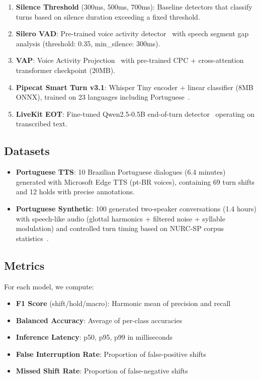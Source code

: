 \documentclass[conference]{IEEEtran}
\begin{document}
\begin{enumerate}
    \item \textbf{Silence Threshold} (300ms, 500ms, 700ms): Baseline detectors
          that classify turns based on silence duration exceeding a fixed threshold.
    \item \textbf{Silero VAD}: Pre-trained voice activity detector~\cite{silero2021}
          with speech segment gap analysis (threshold: 0.35, min\_silence: 300ms).
    \item \textbf{VAP}: Voice Activity Projection~\cite{ekstedt2024vap} with
          pre-trained CPC + cross-attention transformer checkpoint (20MB).
    \item \textbf{Pipecat Smart Turn v3.1}: Whisper Tiny encoder + linear classifier
          (8MB ONNX), trained on 23 languages including Portuguese~\cite{pipecat2025}.
    \item \textbf{LiveKit EOT}: Fine-tuned Qwen2.5-0.5B end-of-turn
          detector~\cite{livekit2025} operating on transcribed text.
\end{enumerate}

\subsection{Datasets}
\begin{itemize}
    \item \textbf{Portuguese TTS}: 10 Brazilian Portuguese dialogues (6.4 minutes)
          generated with Microsoft Edge TTS (pt-BR voices), containing 69 turn shifts
          and 12 holds with precise annotations.
    \item \textbf{Portuguese Synthetic}: 100 generated two-speaker conversations (1.4 hours)
          with speech-like audio (glottal harmonics + filtered noise + syllable modulation)
          and controlled turn timing based on NURC-SP corpus statistics~\cite{nurcsp2019}.
\end{itemize}

\subsection{Metrics}
For each model, we compute:
\begin{itemize}
    \item \textbf{F1 Score} (shift/hold/macro): Harmonic mean of precision and recall
    \item \textbf{Balanced Accuracy}: Average of per-class accuracies
    \item \textbf{Inference Latency}: p50, p95, p99 in milliseconds
    \item \textbf{False Interruption Rate}: Proportion of false-positive shifts
    \item \textbf{Missed Shift Rate}: Proportion of false-negative shifts
\end{itemize}
\end{document}
